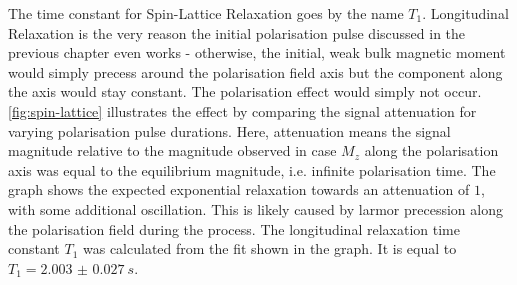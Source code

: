\documentclass[
    parskip=half, 
    twoside=false,
    twocolumn=true,
    fontsize=11pt,
]{scrarticle}
\begin{document}
The time constant for Spin-Lattice Relaxation goes by the name $T_1$. Longitudinal Relaxation is the very reason the initial polarisation pulse discussed in the previous chapter even works - otherwise, the initial, weak bulk magnetic moment would simply precess around the polarisation field axis but the component along the axis would stay constant. The polarisation effect would simply not occur. \autoref{fig:spin-lattice} illustrates the effect by comparing the signal attenuation for varying polarisation pulse durations. Here, attenuation means the signal magnitude relative to the magnitude observed in case $M_z$ along the polarisation axis was equal to the equilibrium magnitude, i.e. infinite polarisation time. The graph shows the expected exponential relaxation towards an attenuation of $1$, with some additional oscillation. This is likely caused by larmor precession along the polarisation field during the process. The longitudinal relaxation time constant $T_1$ was calculated from the fit shown in the graph. It is equal to $T_1 = \SI{2.003(27)}{s}$.
\end{document}
